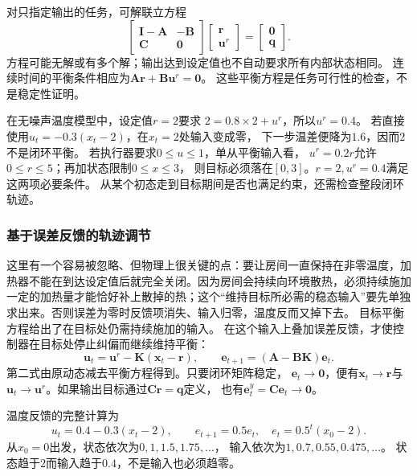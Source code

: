 对只指定输出的任务，可解联立方程
\[
  \begin{bmatrix}\bm I-\bm A&-\bm B\\\bm C&\bm0\end{bmatrix}
  \begin{bmatrix}\bm r\\\bm u^r\end{bmatrix}
  =\begin{bmatrix}\bm0\\\bm q\end{bmatrix}.
\]
方程可能无解或有多个解；输出达到设定值也不自动要求所有内部状态相同。
连续时间的平衡条件相应为$\bm A\bm r+\bm B\bm u^r=\bm0$。
这些平衡方程是任务可行性的检查，不是稳定性证明。

\begin{example}[非零温度需要维持输入]
\label{ex:control-temperature-equilibrium}
在无噪声温度模型中，设定值$r=2$要求
$2=0.8\times2+u^r$，所以$u^r=0.4$。
若直接使用$u_t=-0.3(x_t-2)$，在$x_t=2$处输入变成零，
下一步温差便降为$1.6$，因而$2$不是闭环平衡。
若执行器要求$0\leq u\leq1$，单从平衡输入看，
$u^r=0.2r$允许$0\leq r\leq5$；再加状态限制$0\leq x\leq3$，
则目标必须落在$[0,3]$。$r=2,u^r=0.4$满足这两项必要条件。
从某个初态走到目标期间是否也满足约束，还需检查整段闭环轨迹。
\end{example}

\subsubsection{基于误差反馈的轨迹调节}
这里有一个容易被忽略、但物理上很关键的点：要让房间一直保持在非零温度，加热器不能在到达设定值后就完全关闭。因为房间会持续向环境散热，必须持续施加一定的加热量才能恰好补上散掉的热；这个“维持目标所必需的稳态输入”要先单独求出来。否则误差为零时反馈项消失、输入归零，温度反而又掉下去。
目标平衡方程给出了在目标处仍需持续施加的输入。
在这个输入上叠加误差反馈，才使控制器在目标处停止纠偏而继续维持平衡：
\begin{equation}
  \bm u_t=\bm u^r-\bm K(\bm x_t-\bm r),
  \qquad
  \bm e_{t+1}=(\bm A-\bm B\bm K)\bm e_t.
  \label{eq:control-regulation-feedback}
\end{equation}
第二式由原动态减去平衡方程得到。只要闭环矩阵稳定，
$\bm e_t\to\bm0$，便有$\bm x_t\to\bm r$与
$\bm u_t\to\bm u^r$。如果输出目标通过$\bm C\bm r=\bm q$定义，
也有$\bm e_t^y=\bm C\bm e_t\to\bm0$。

温度反馈的完整计算为
\begin{equation}
  u_t=0.4-0.3(x_t-2),
  \qquad
  e_{t+1}=0.5e_t,\quad e_t=0.5^t(x_0-2).
  \label{eq:control-temperature-regulation}
\end{equation}
从$x_0=0$出发，状态依次为$0,1,1.5,1.75,\ldots$，
输入依次为$1,0.7,0.55,0.475,\ldots$。
状态趋于$2$而输入趋于$0.4$，不是输入也必须趋零。

